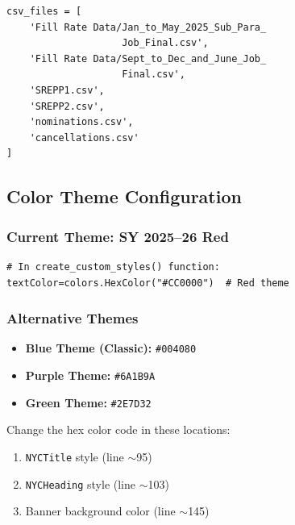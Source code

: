 \documentclass[12pt,letterpaper]{article}
\begin{document}
\begin{tcolorbox}[colback=gray!5!white,colframe=graytext,title=\textbf{Example: SY 2024--25 (Historical)},breakable]
\begin{Verbatim}[fontsize=\small]
csv_files = [
    'Fill Rate Data/Jan_to_May_2025_Sub_Para_
                    Job_Final.csv',
    'Fill Rate Data/Sept_to_Dec_and_June_Job_
                    Final.csv',
    'SREPP1.csv',
    'SREPP2.csv',
    'nominations.csv',
    'cancellations.csv'
]
\end{Verbatim}
\end{tcolorbox}

\subsection{Color Theme Configuration}

\subsubsection{Current Theme: SY 2025--26 Red}

\begin{tcolorbox}[colback=gray!5!white,colframe=graytext,breakable]
\begin{Verbatim}[fontsize=\small]
# In create_custom_styles() function:
textColor=colors.HexColor("#CC0000")  # Red theme
\end{Verbatim}
\end{tcolorbox}

\subsubsection{Alternative Themes}

\begin{itemize}[leftmargin=*]
    \item \textbf{Blue Theme (Classic):} \texttt{\#004080}
    \item \textbf{Purple Theme:} \texttt{\#6A1B9A}
    \item \textbf{Green Theme:} \texttt{\#2E7D32}
\end{itemize}

Change the hex color code in these locations:
\begin{enumerate}[leftmargin=*]
    \item \texttt{NYCTitle} style (line $\sim$95)
    \item \texttt{NYCHeading} style (line $\sim$103)
    \item Banner background color (line $\sim$145)
\end{enumerate}
\end{document}
